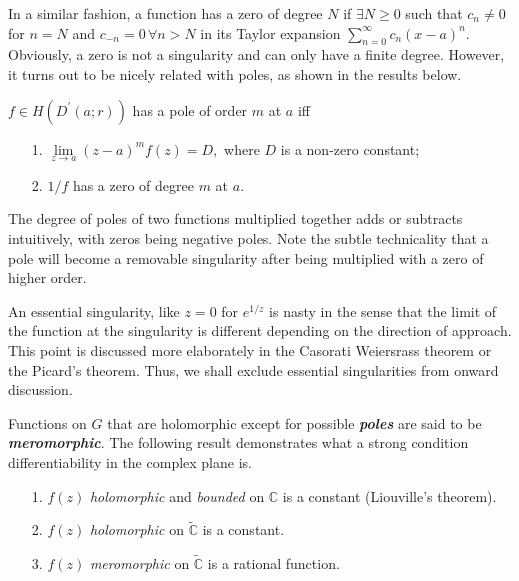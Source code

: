 \documentclass{article}
\begin{document}
In a similar fashion, a function has a zero of degree $N$ if $\exists N \geq 0$ such that $c_{n} \neq 0$ for $n=N$ and $c_{-n} = 0 \, \forall n>N$ in its Taylor expansion 
\(
    \sum_{n=0}^{\infty} c_n (x-a)^n. 
\)
Obviously, a zero is not a singularity and can only have a finite degree. However, it turns out to be nicely related with poles, as shown in the results below. 
\begin{frm-res}
    $f \in H(D^\prime (a;r))$ has a pole of order $m$ at $a$ iff
    \begin{itemize}
        \item[1.] 
        \(\lim\limits_{z \to a} (z-a)^m f(z) = D,\) 
        where $D$ is a non-zero constant;
        \item[2.]
        $1/f$ has a zero of degree $m$ at $a$. 
    \end{itemize}
\end{frm-res}
The degree of poles of two functions multiplied together adds or subtracts intuitively, with zeros being negative poles. Note the subtle technicality that a pole will become a removable singularity after being multiplied with a zero of higher order. 

An essential singularity, like $z=0$ for $e^{1/z}$ is nasty in the sense that the limit of the function at the singularity is different depending on the direction of approach. This point is discussed more elaborately in the Casorati \textendash Weiersrass theorem or the Picard's theorem. Thus, we shall exclude essential singularities from onward discussion. 

Functions on $G$ that are holomorphic except for possible \textit{\textbf{poles}} are said to be \textit{\textbf{meromorphic}}. The following result demonstrates what a strong condition differentiability in the complex plane is. 

\begin{frm-res}
    \quad 
    \begin{itemize}
        \item[1.] $f(z)$ \textit{holomorphic} and \textit{bounded} on $\mathbb{C}$ is a constant (Liouville's theorem). 
        \item[2.] $f(z)$ \textit{holomorphic} on $\widetilde{\mathbb{C}}$ is a constant. 
        \item[3.] $f(z)$ \textit{meromorphic} on $\widetilde{\mathbb{C}}$ is a rational function. 
    \end{itemize}
\end{frm-res}
\end{document}

